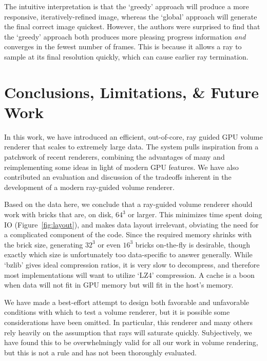 

The intuitive interpretation is that the `greedy' approach will produce
a more responsive, iteratively-refined image, whereas the `global'
approach will generate the final correct image quickest.  However, the
authors were surprised to find that the `greedy' approach both produces
more pleasing progress information \emph{and} converges in the fewest
number of frames.  This is because it allows a ray to sample at its
final resolution quickly, which can cause earlier ray termination.

\section{Conclusions, Limitations, \& Future Work}
\label{sec:conclusion}

In this work, we have introduced an efficient, out-of-core, ray guided
GPU volume renderer that scales to extremely large data.  The system
pulls inspiration from a patchwork of recent renderers, combining the
advantages of many and reimplementing some ideas in light of modern GPU
features.  We have also contributed an evaluation and discussion of the
tradeoffs inherent in the development of a modern ray-guided volume
renderer.

Based on the data here, we conclude that a ray-guided volume renderer
should work with bricks that are, on disk, $64^3$ or larger.  This
minimizes time spent doing IO (Figure~\ref{fig:layout}), and makes
data layout irrelevant, obviating the need for a complicated component
of the code.  Since the required memory shrinks with the brick size,
generating $32^3$ or even $16^3$ bricks on-the-fly is desirable,
though exactly which size is unfortunately too data-specific to answer
generally.  While `bzlib' gives ideal compression ratios, it is very
slow to decompress, and therefore most implementations will want to
utilize `LZ4' compression.  A cache is a boon when data will not fit in
GPU memory but will fit in the host's memory.

We have made a best-effort attempt to design both favorable and
unfavorable conditions with which to test a volume renderer, but it
is possible some considerations have been omitted.  In particular,
this renderer and many others rely heavily on the assumption that
rays will saturate quickly.  Subjectively, we have found this to be
overwhelmingly valid for all our work in volume rendering, but this is
not a rule and has not been thoroughly evaluated.

